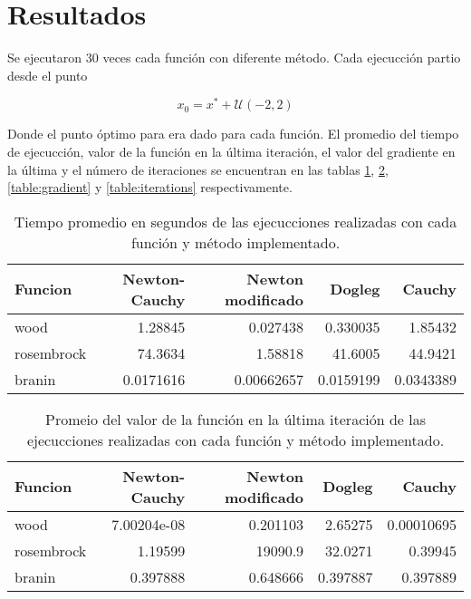 \section{Resultados}

Se ejecutaron 30 veces cada función con diferente método. Cada ejecucción partio desde el punto

\begin{equation*}
    x_0 = x^* + \mathcal{U}(-2,2)
\end{equation*}

Donde el punto óptimo para era dado para cada función. El promedio del tiempo de ejecucción, valor de la función en la última iteración, el valor del gradiente en la última y el número de iteraciones se encuentran en las tablas \ref{table:time}, \ref{table:function}, \ref{table:gradient} y \ref{table:iterations} respectivamente.

\begin{table}[H]
    \centering
    \begin{tabular}{lrrrr}
        \hline
        \textbf{Funcion} & \textbf{Newton-Cauchy} & \textbf{Newton modificado} & \textbf{Dogleg} & \textbf{Cauchy} \\
        \hline
        wood             & 1.28845                & 0.027438                   & 0.330035        & 1.85432         \\
        rosembrock       & 74.3634                & 1.58818                    & 41.6005         & 44.9421         \\
        branin           & 0.0171616              & 0.00662657                 & 0.0159199       & 0.0343389       \\
        \hline
    \end{tabular}
    \caption{Tiempo promedio en segundos de las ejecucciones realizadas con cada función y método implementado.}
    \label{table:time}
\end{table}

\begin{table}[H]
    \centering
    \begin{tabular}{lrrrr}
        \hline
        \textbf{Funcion} & \textbf{Newton-Cauchy} & \textbf{Newton modificado} & \textbf{Dogleg} & \textbf{Cauchy} \\
        \hline
        wood             & 7.00204e-08            & 0.201103                   & 2.65275         & 0.00010695      \\
        rosembrock       & 1.19599                & 19090.9                    & 32.0271         & 0.39945         \\
        branin           & 0.397888               & 0.648666                   & 0.397887        & 0.397889        \\
        \hline
    \end{tabular}
    \caption{Promeio del valor de la función en la última iteración de las ejecucciones realizadas con cada función y método implementado.}
    \label{table:function}
\end{table}

